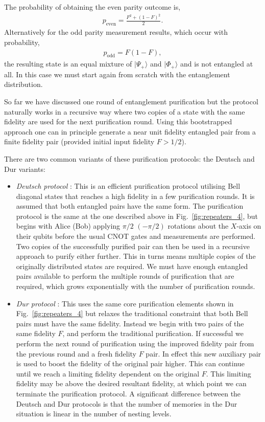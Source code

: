 \documentclass[twocolumn, aps, rmp, amsmath, amssymb, nofootinbib, superscriptaddress, longbibliography, floatfix, table-of-contents, eqsecnum]{revtex4-1}
\begin{document}
The probability of obtaining the even parity outcome is,
\begin{align}
	p_\mathrm{even}=\frac{F^2+(1-F)^2}{2}.
\end{align}
Alternatively for the odd parity measurement results, which occur with probability,
\begin{align}
	p_\mathrm{odd}=F(1-F),
\end{align}
the resulting state is an equal mixture of $|\Psi_+\rangle$ and $|\Phi_+\rangle$ and is not entangled at all. In this case we must start again from scratch with the entanglement distribution.

So far we have discussed one round of entanglement purification but the protocol naturally works in a recursive way where two copies of a state with the same fidelity are used for the next purification round. Using this bootstrapped approach one can in principle generate a near unit fidelity entangled pair from a finite fidelity pair (provided initial input fidelity \mbox{$F>1/2$}). 

There are two common variants of these purification protocols: the Deutsch and Dur variants:
\begin{itemize}
\item \textit{Deutsch protocol} \cite{Deutsch98}: This is an efficient purification protocol utilising Bell diagonal states that reaches a high fidelity in a few purification rounds. It is assumed that both entangled pairs have the same form. The purification protocol is the same at the one described above in Fig.~\ref{fig:repeaters_4}, but begins with Alice (Bob) applying $\pi/2$ $(-\pi/2)$ rotations about the $X$-axis on their qubits before the usual CNOT gates and measurements are performed. Two copies of the successfully purified pair can then be used in a recursive approach to purify either further. This in turns means multiple copies of the originally distributed states are required. We must have enough entangled pairs available to perform the multiple rounds of purification that are required, which grows exponentially with the number of purification rounds. 

\item \textit{Dur protocol} \cite{dur98}: This uses the same core purification elements shown in Fig.~\ref{fig:repeaters_4} but relaxes the traditional constraint that both Bell pairs must have the same fidelity. Instead we begin with two pairs of the same fidelity $F$, and perform the traditional purification. If successful we perform the next round of purification using the improved fidelity pair from the previous round and a fresh fidelity $F$ pair. In effect this new auxiliary pair is used to boost the fidelity of the original pair higher. This can continue until we reach a limiting fidelity dependent on the original $F$. This limiting fidelity may be above the desired resultant fidelity, at which point we can terminate the purification protocol. A significant difference between the Deutsch and Dur protocols is that the number of memories in the Dur situation is linear in the number of nesting levels.
\end{itemize}
\end{document}
